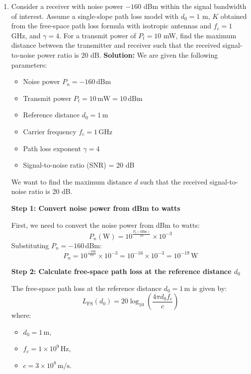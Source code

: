 \documentclass[a4paper,12pt]{book}
\begin{document}
\begin{enumerate}
		\item Consider a receiver with noise power $-160$ dBm within the signal bandwidth of interest. Assume a single-slope path loss model with $d_0 = 1$ m, $K$ obtained from the free-space path loss formula with isotropic antennas and $f_c = 1$ GHz, and $\gamma = 4$. For a transmit power of $P_t = 10$ mW, find the maximum distance between the transmitter and receiver such that the received signal-to-noise power ratio is 20 dB.
		\newline\newline\noindent
		\textbf{Solution:} We are given the following parameters:
		\begin{itemize}
			\item Noise power \( P_n = -160 \, \text{dBm} \)
			\item Transmit power \( P_t = 10 \, \text{mW} = 10 \, \text{dBm} \)
			\item Reference distance \( d_0 = 1 \, \text{m} \)
			\item Carrier frequency \( f_c = 1 \, \text{GHz} \)
			\item Path loss exponent \( \gamma = 4 \)
			\item Signal-to-noise ratio (SNR) = 20 dB
		\end{itemize}
		
		We want to find the maximum distance \( d \) such that the received signal-to-noise ratio is 20 dB.
		
		\textbf{Step 1: Convert noise power from dBm to watts}\newline
		
		First, we need to convert the noise power from dBm to watts:
		\[
		P_n (\text{W}) = 10^{\frac{P_n (\text{dBm})}{10}} \times 10^{-3}
		\]
		Substituting \( P_n = -160 \, \text{dBm} \):
		\[
		P_n = 10^{\frac{-160}{10}} \times 10^{-3} = 10^{-16} \times 10^{-3} = 10^{-19} \, \text{W}
		\]
		
		\textbf{Step 2: Calculate free-space path loss at the reference distance \( d_0 \)}\newline
		
		The free-space path loss at the reference distance \( d_0 = 1 \, \text{m} \) is given by:
		\[
		L_{\text{FS}}(d_0) = 20 \log_{10} \left( \frac{4\pi d_0 f_c}{c} \right)
		\]
		where:
		\begin{itemize}
			\item \( d_0 = 1 \, \text{m} \),
			\item \( f_c = 1 \times 10^9 \, \text{Hz} \),
			\item \( c = 3 \times 10^8 \, \text{m/s} \).
		\end{itemize}
		

\end{enumerate}
\end{document}
